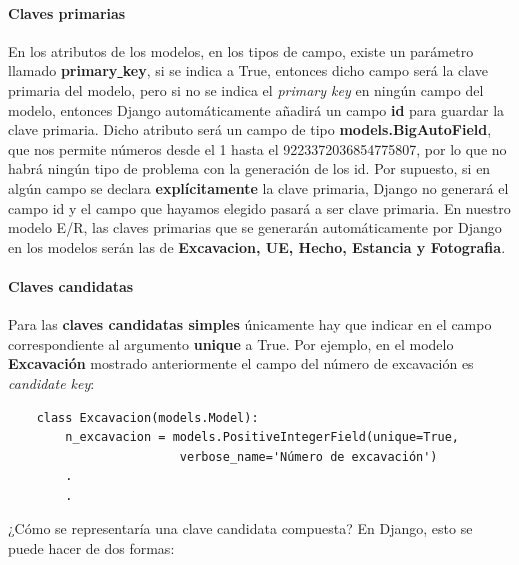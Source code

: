     \paragraph{Claves primarias} \underline{}
    \newline En los atributos de los modelos, en los tipos de campo, existe un parámetro llamado
    \textbf{primary\underline{ }key}, si se indica a True, entonces dicho campo será la clave
    primaria del modelo, pero si no se indica el \textit{primary key} en ningún campo del modelo,
    entonces Django automáticamente añadirá un campo \textbf{id} para guardar la clave primaria.
    Dicho atributo será un campo de tipo \textbf{models.BigAutoField}, que nos permite números
    desde el 1 hasta el 9223372036854775807, por lo que no habrá ningún tipo de problema con
    la generación de los id. Por supuesto, si en algún campo se declara \textbf{explícitamente}
    la clave primaria, Django no generará el campo id y el campo que hayamos elegido pasará a
    ser clave primaria. En nuestro modelo E/R, las claves primarias que se generarán
    automáticamente por Django en los modelos serán las de \textbf{Excavacion, UE, Hecho,
    Estancia y Fotografia}. 
    
    \paragraph{Claves candidatas} \underline{}
    \newline Para las \textbf{claves candidatas simples} únicamente hay que indicar en el campo
    correspondiente al argumento \textbf{unique} a True. Por ejemplo, en el modelo
    \textbf{Excavación} mostrado anteriormente el campo del número de excavación es
    \textit{candidate key}:
    
    
    \begin{verbatim}
    class Excavacion(models.Model):
        n_excavacion = models.PositiveIntegerField(unique=True, 
                        verbose_name='Número de excavación')
        .
        .
    \end{verbatim}

    ¿Cómo se representaría una clave candidata compuesta? En Django, esto se puede hacer de
    dos formas:

